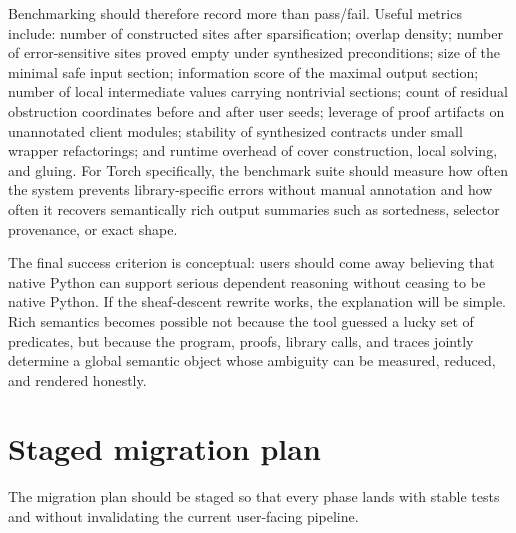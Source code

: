 \documentclass[11pt]{report}
\theoremstyle{definition}
\theoremstyle{plain}
\begin{document}
Benchmarking should therefore record more than pass/fail. Useful metrics include:
number of constructed sites after sparsification; overlap density; number of
error-sensitive sites proved empty under synthesized preconditions; size of the
minimal safe input section; information score of the maximal output section;
number of local intermediate values carrying nontrivial sections; count of
residual obstruction coordinates before and after user seeds; leverage of proof
artifacts on unannotated client modules; stability of synthesized contracts under
small wrapper refactorings; and runtime overhead of cover construction, local
solving, and gluing. For Torch specifically, the benchmark suite should measure
how often the system prevents library-specific errors without manual annotation
and how often it recovers semantically rich output summaries such as sortedness,
selector provenance, or exact shape.

The final success criterion is conceptual: users should come away believing that
native Python can support serious dependent reasoning without ceasing to be
native Python. If the sheaf-descent rewrite works, the explanation will be
simple. Rich semantics becomes possible not because the tool guessed a lucky set
of predicates, but because the program, proofs, library calls, and traces jointly
determine a global semantic object whose ambiguity can be measured, reduced, and
rendered honestly.


\section{Staged migration plan}

The migration plan should be staged so that every phase lands with stable tests
and without invalidating the current user-facing pipeline.
\end{document}
